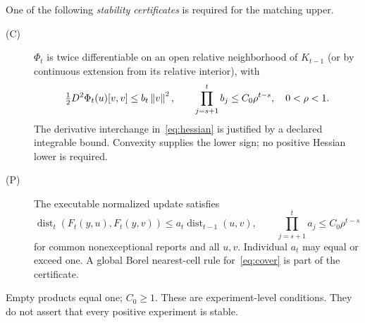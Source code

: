 One of the following \emph{stability certificates} is required for the matching upper.
\begin{description}
\item[(C)] $\Phi_t$ is twice differentiable on an open relative neighborhood of $K_{t-1}$ (or by continuous extension from its relative interior), with
\[
 \tfrac12D^2\Phi_t(u)[v,v]\le b_t\left\lVert v\right\rVert^2,
 \qquad \prod_{j=s+1}^{t}b_j\le C_0\rho^{t-s},\quad 0<\rho<1.
\]
The derivative interchange in~\eqref{eq:hessian} is justified by a declared integrable bound. Convexity supplies the lower sign; no positive Hessian lower is required.
\item[(P)] The executable normalized update satisfies
\[
 \operatorname{dist}_t(F_t(y,u),F_t(y,v))
 \le a_t\operatorname{dist}_{t-1}(u,v),
 \qquad \prod_{j=s+1}^{t}a_j\le C_0\rho^{t-s}
\]
for common nonexceptional reports and all $u,v$. Individual $a_t$ may equal or exceed one. A global Borel nearest-cell rule for~\eqref{eq:cover} is part of the certificate.
\end{description}
Empty products equal one; $C_0\ge1$. These are experiment-level conditions. They do not assert that every positive experiment is stable.

